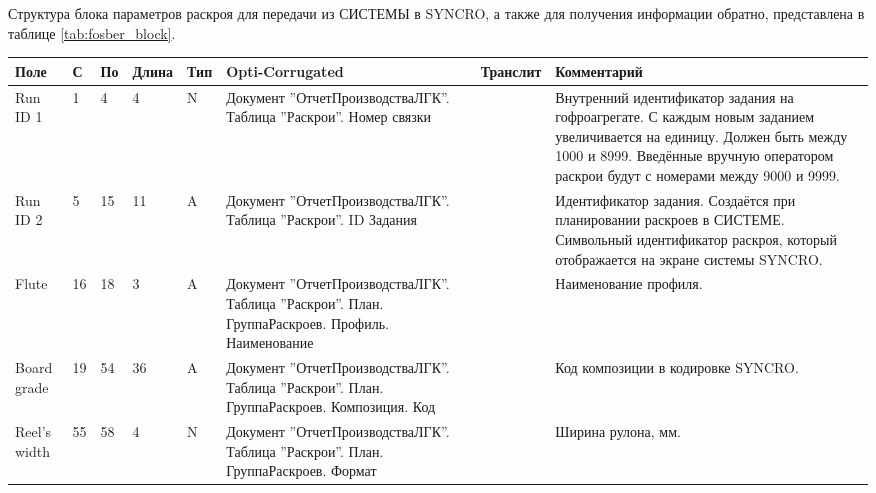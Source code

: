 
\scriptsize
\begin{landscape}
Структура блока параметров раскроя для передачи из СИСТЕМЫ в SYNCRO, а также для получения информации обратно, представлена в таблице \ref{tab:fosber_block}.

\begin{longtable}{|p{25mm}|p{6mm}|p{6mm}|p{8mm}|p{6mm}|p{60mm}|p{12mm}|p{100mm}|}
\hline

\parbox[c][10mm]{20mm}{\centering Поле} & \parbox{5mm}{\centering С} & \parbox{5mm}{\centering По} & \parbox{5mm}{\centering Длина} & \parbox{5mm}{\centering Тип} & \parbox{49mm}{\centering Opti-Corrugated} & \parbox{5mm}{\centering Транслит} & \parbox{80mm}{\centering Комментарий} \\
\hline
\parbox[c][20mm]{25mm}{Run ID 1} & \parbox{10mm}{1} & \parbox{10mm}{4} & \parbox{10mm}{4} & \parbox{10mm}{N} & \parbox{40mm}{Документ ''ОтчетПроизводстваЛГК''. Таблица ''Раскрои''. Номер связки} & \parbox{11mm}{} & \parbox{89mm}{Внутренний идентификатор задания на гофроагрегате. С каждым новым заданием увеличивается на единицу. Должен быть между 1000 и 8999. Введённые вручную оператором раскрои будут с номерами между 9000 и 9999.} \\
\hline
\parbox[c][20mm]{25mm}{Run ID 2} & \parbox{10mm}{5} & \parbox{10mm}{15} & \parbox{10mm}{11} & \parbox{10mm}{A} & \parbox{49mm}{Документ ''ОтчетПроизводстваЛГК''. Таблица ''Раскрои''. ID Задания} & \parbox{11mm}{} & \parbox{89mm}{Идентификатор задания. Создаётся при планировании раскроев в СИСТЕМЕ. Символьный идентификатор раскроя, который отображается на экране системы SYNCRO.} \\
\hline
\parbox[c][22mm]{25mm}{Flute} & \parbox{10mm}{16} & \parbox{10mm}{18} & \parbox{10mm}{3} & \parbox{10mm}{A} & \parbox{49mm}{Документ ''ОтчетПроизводстваЛГК''. Таблица ''Раскрои''. План. ГруппаРаскроев. Профиль. Наименование} & \parbox{11mm}{} & \parbox{89mm}{Наименование профиля.} \\
\hline
\parbox[c][22mm]{25mm}{Board grade} & \parbox{10mm}{19} & \parbox{10mm}{54} & \parbox{10mm}{36} & \parbox{10mm}{A} & \parbox{49mm}{Документ ''ОтчетПроизводстваЛГК''. Таблица ''Раскрои''. План. ГруппаРаскроев. Композиция. Код} & \parbox{11mm}{} & \parbox{89mm}{Код композиции в кодировке SYNCRO.} \\
\hline
\parbox[c][22mm]{25mm}{Reel's width} & \parbox{10mm}{55} & \parbox{10mm}{58} & \parbox{10mm}{4} & \parbox{10mm}{N} & \parbox{49mm}{Документ ''ОтчетПроизводстваЛГК''. Таблица ''Раскрои''. План. ГруппаРаскроев. Формат} & \parbox{11mm}{} & \parbox{89mm}{Ширина рулона, мм.} \\

\end{longtable}
\end{landscape}
